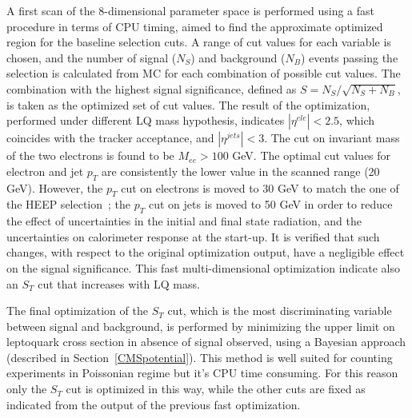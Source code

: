 A first scan of the 8-dimensional parameter space is performed using a fast procedure in terms of CPU timing, 
aimed to find the approximate optimized region for the baseline selection cuts.
A range of cut values for each variable is chosen, and the number of signal ($N_S$) 
and background ($N_B$) events passing the selection is calculated from MC for each combination 
of possible cut values. The combination with the highest signal significance, 
defined as $S = N_S/\sqrt{N_S+N_B}$, is taken as the optimized set of cut values. %
The result of the optimization, performed under different LQ mass hypothesis, 
indicates $|\eta^{ele}|<2.5$, which coincides with the tracker acceptance,
and $|\eta^{jets}|<3$. The cut on invariant mass of the two electrons is found to be $M_{ee}>100$ GeV. The 
optimal cut values for electron and jet $p_T$ are consistently the lower value in the scanned range 
(20 GeV). However, the $p_{T}$ cut on electrons is moved to 30 GeV to match the one of the HEEP 
selection~\cite{HEEPNOTE}; %
the $p_{T}$ cut on jets is moved to 50 GeV in order to reduce the effect 
of uncertainties in the initial and final state radiation, and the uncertainties 
on calorimeter response at the start-up. It is verified that such changes, with respect to the original 
optimization output, have a negligible effect on the signal significance. 
This fast multi-dimensional optimization indicate also an $S_T$ cut 
that increases with LQ mass. 

The final optimization of the $S_T$ cut, which is the most discriminating variable between signal and background, 
is performed by minimizing the upper limit on leptoquark cross section in absence of signal observed, 
using a Bayesian approach (described in Section~\ref{CMSpotential}). 
This method is well suited for counting experiments in Poissonian regime but it's CPU time consuming. 
For this reason only the $S_T$ cut is optimized in this way, while the other cuts are fixed as indicated from 
the output of the previous fast optimization.

